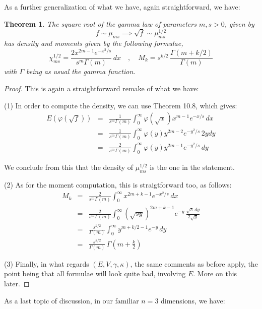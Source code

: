 \documentclass[12pt]{amsbook}
\newtheorem{theorem}{Theorem}[chapter]
\begin{document}
As a further generalization of what we have, again straightforward, we have:


\begin{theorem}
The square root of the gamma law of parameters $m,s>0$, given by
$$f\sim\mu_{ms}\implies\sqrt{f}\sim\mu_{ms}^{1/2}$$
has density and moments given by the following formulae,
$$\chi_{ms}^{1/2}=\frac{2x^{2m-1}e^{-x^2/s}}{s^m\Gamma(m)}\,dx
\quad,\quad 
M_k=s^{k/2}\,\frac{\Gamma(m+k/2)}{\Gamma(m)}$$
with $\Gamma$ being as usual the gamma function.
\end{theorem}

\begin{proof}
This is again a straightforward remake of what we have:

\medskip

(1) In order to compute the density, we can use Theorem 10.8, which gives:
\begin{eqnarray*}
E(\varphi(\sqrt{f}))
&=&\frac{1}{s^m\Gamma(m)}\int_0^\infty\varphi(\sqrt{x})x^{m-1}e^{-x/s}\,dx\\
&=&\frac{1}{s^m\Gamma(m)}\int_0^\infty\varphi(y)y^{2m-2}e^{-y^2/s}\,2ydy\\
&=&\frac{2}{s^m\Gamma(m)}\int_0^\infty\varphi(y)y^{2m-1}e^{-y^2/s}\,dy
\end{eqnarray*}

We conclude from this that the density of $\mu_{ms}^{1/2}$ is the one in the statement.

\medskip

(2) As for the moment computation, this is straigtforward too, as follows:
\begin{eqnarray*}
M_k
&=&\frac{2}{s^m\Gamma(m)}\int_0^\infty x^{2m+k-1}e^{-x^2/s}\,dx\\
&=&\frac{2}{s^m\Gamma(m)}\int_0^\infty\left(\sqrt{sy}\right)^{2m+k-1}e^{-y}\,\frac{\sqrt{s}\,dy}{2\sqrt{y}}\\
&=&\frac{s^{k/2}}{\Gamma(m)}\int_0^\infty y^{m+k/2-1}e^{-y}\,dy\\
&=&\frac{s^{k/2}}{\Gamma(m)}\,\Gamma\left(m+\frac{k}{2}\right)
\end{eqnarray*}

(3) Finally, in what regards $(E,V,\gamma,\kappa)$, the same comments as before apply, the point being that all formulae will look quite bad, involving $E$. More on this later.
\end{proof}

As a last topic of discussion, in our familiar $n=3$ dimensions, we have:
\end{document}
